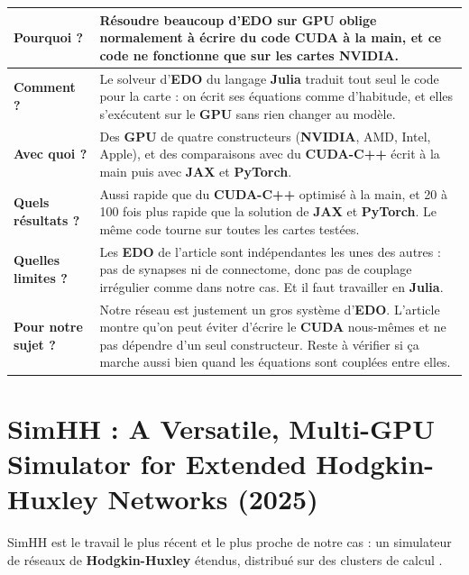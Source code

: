 \documentclass{report}
\begin{document}
\medskip
\begin{tabular}{|p{3.2cm}|p{11.2cm}|}
\hline
\textbf{Pourquoi ?} & Résoudre beaucoup d'\textbf{EDO} sur \textbf{GPU} oblige normalement à écrire du code \textbf{CUDA} à la main, et ce code ne fonctionne que sur les cartes \textbf{NVIDIA}. \\ \hline
\textbf{Comment ?} & Le solveur d'\textbf{EDO} du langage \textbf{Julia} traduit tout seul le code pour la carte : on écrit ses équations comme d'habitude, et elles s'exécutent sur le \textbf{GPU} sans rien changer au modèle. \\ \hline
\textbf{Avec quoi ?} & Des \textbf{GPU} de quatre constructeurs (\textbf{NVIDIA}, AMD, Intel, Apple), et des comparaisons avec du \textbf{CUDA-C++} écrit à la main puis avec \textbf{JAX} et \textbf{PyTorch}. \\ \hline
\textbf{Quels résultats ?} & Aussi rapide que du \textbf{CUDA-C++} optimisé à la main, et 20 à 100 fois plus rapide que la solution de \textbf{JAX} et \textbf{PyTorch}. Le même code tourne sur toutes les cartes testées. \\ \hline
\textbf{Quelles limites ?} & Les \textbf{EDO} de l'article sont indépendantes les unes des autres : pas de synapses ni de connectome, donc pas de couplage irrégulier comme dans notre cas. Et il faut travailler en \textbf{Julia}. \\ \hline
\textbf{Pour notre sujet ?} & Notre réseau est justement un gros système d'\textbf{EDO}. L'article montre qu'on peut éviter d'écrire le \textbf{CUDA} nous-mêmes et ne pas dépendre d'un seul constructeur. Reste à vérifier si ça marche aussi bien quand les équations sont couplées entre elles. \\ \hline
\end{tabular}

\section{SimHH : A Versatile, Multi-GPU Simulator for Extended Hodgkin-Huxley Networks (2025)}

SimHH est le travail le plus récent et le plus proche de notre cas : un simulateur de réseaux de \textbf{Hodgkin-Huxley} étendus, distribué sur des clusters de calcul \cite{engelen2025}.
\end{document}
